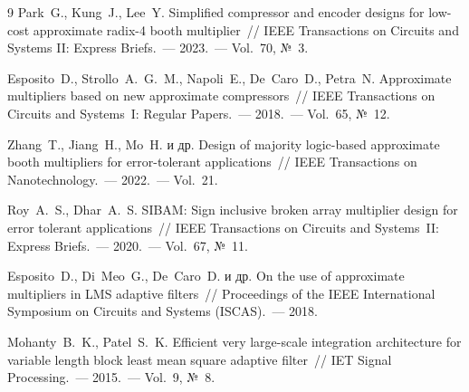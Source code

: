\documentclass[a4paper, 12pt, oneside]{report}
\begin{document}
\begin{thebibliography}{9}
  Park~G., Kung~J., Lee~Y. Simplified compressor and encoder designs
  for low-cost approximate radix-4 booth multiplier~// IEEE
  Transactions on Circuits and Systems II: Express Briefs.~---
  2023.~--- Vol.~70, №~3.

  Esposito~D., Strollo~A.~G.~M., Napoli~E., De~Caro~D., Petra~N.
  Approximate multipliers based on new approximate compressors~//
  IEEE Transactions on Circuits and Systems~I: Regular Papers.~---
  2018.~--- Vol.~65, №~12.

  Zhang~T., Jiang~H., Mo~H. и др. Design of majority logic-based
  approximate booth multipliers for error-tolerant applications~//
  IEEE Transactions on Nanotechnology.~--- 2022.~--- Vol.~21.

  Roy~A.~S., Dhar~A.~S. SIBAM: Sign inclusive broken array multiplier
  design for error tolerant applications~// IEEE Transactions on
  Circuits and Systems~II: Express Briefs.~--- 2020.~--- Vol.~67, №~11.

  Esposito~D., Di~Meo~G., De~Caro~D. и др. On the use of approximate
  multipliers in LMS adaptive filters~// Proceedings of the IEEE
  International Symposium on Circuits and Systems (ISCAS).~--- 2018.

  Mohanty~B.~K., Patel~S.~K. Efficient very large-scale integration
  architecture for variable length block least mean square adaptive
  filter~// IET Signal Processing.~--- 2015.~--- Vol.~9, №~8.

\end{thebibliography}
\end{document}
